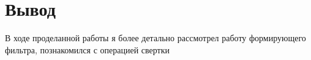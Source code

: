 \chapter{Вывод}
\label{ch:chap3}

В ходе проделанной работы я более детально рассмотрел работу формирующего фильтра, познакомился с операцией свертки 
\endinput